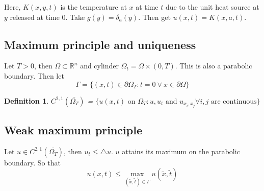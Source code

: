 \documentclass{article}
\newtheorem{definition}[theorem]{Definition}
\newtheorem{one minute paper}[theorem]{One Minute Paper}
\begin{document}
Here, $K(x,y,t)$ is the temperature at $x$ at time $t$ due to the unit heat source at $y$ released at time $0$. Take $g(y) = \delta_a(y)$. Then get $u(x,t) = K(x,a,t)$. 

\subsection*{Maximum principle and uniqueness}

Let $T > 0$, then $\Omega \subset \mathbb{R}^n$ and cylinder $\Omega_t = \Omega \times (0,T)$. This is also a parabolic boundary. Then let $$\Gamma = \{(x,t) \in \partial \Omega_T: t = 0 \lor x \in \partial \Omega\}$$

\begin{definition}
    $C^{2,1}\left( \overline{\Omega_T} \right)$  = $\{u(x,t) \text{ on } \Omega_T: u,u_t \text{ and } u_{x_i,x_j} \forall i,j \text{ are continuous}\}$
\end{definition}

\subsection*{Weak maximum principle}

Let $u \in C^{2,1}\left( \overline{\Omega_T} \right)$, then $u_t \leq \triangle u$. $u$ attains its maximum on the parabolic boundary. 
So that $$u(x,t) \leq \max_{\left( \tilde{x}, \tilde{t} \right) \in \Gamma}u(\tilde{x}, \tilde{t})$$ 
\end{document}

